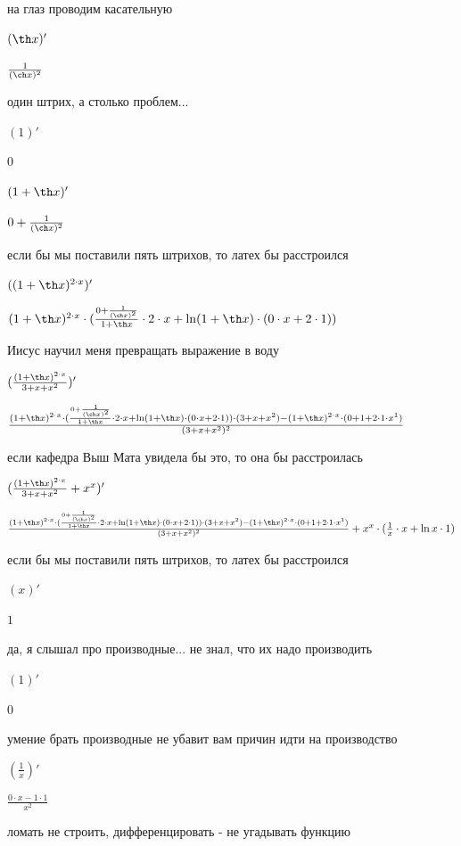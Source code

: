 \documentclass[a4paper,12pt]{article}
\begin{document}
на глаз проводим касательную 

$( \th x)'$

$ \frac{1}{( \ch x)^{2}} $

один штрих, а столько проблем... 

$(1)'$

$0$

  

$(1+ \th x)'$

$0+ \frac{1}{( \ch x)^{2}} $

если бы мы поставили пять штрихов, то латех бы расстроился 

$((1+ \th x)^{2 \cdot x})'$

$(1+ \th x)^{2 \cdot x} \cdot ( \frac{0+ \frac{1}{( \ch x)^{2}} }{1+ \th x}  \cdot 2 \cdot x+ \ln (1+ \th x) \cdot (0 \cdot x+2 \cdot 1))$

Иисус научил меня превращать выражение в воду 

$( \frac{(1+ \th x)^{2 \cdot x}}{3+x+x^{2}} )'$

$ \frac{(1+ \th x)^{2 \cdot x} \cdot ( \frac{0+ \frac{1}{( \ch x)^{2}} }{1+ \th x}  \cdot 2 \cdot x+ \ln (1+ \th x) \cdot (0 \cdot x+2 \cdot 1)) \cdot (3+x+x^{2})-(1+ \th x)^{2 \cdot x} \cdot (0+1+2 \cdot 1 \cdot x^{1})}{(3+x+x^{2})^{2}} $

если кафедра Выш Мата увидела бы это, то она бы расстроилась 

$( \frac{(1+ \th x)^{2 \cdot x}}{3+x+x^{2}} +x^{x})'$

$ \frac{(1+ \th x)^{2 \cdot x} \cdot ( \frac{0+ \frac{1}{( \ch x)^{2}} }{1+ \th x}  \cdot 2 \cdot x+ \ln (1+ \th x) \cdot (0 \cdot x+2 \cdot 1)) \cdot (3+x+x^{2})-(1+ \th x)^{2 \cdot x} \cdot (0+1+2 \cdot 1 \cdot x^{1})}{(3+x+x^{2})^{2}} +x^{x} \cdot ( \frac{1}{x}  \cdot x+ \ln x \cdot 1)$

если бы мы поставили пять штрихов, то латех бы расстроился 

$(x)'$

$1$

да, я слышал про производные... не знал, что их надо производить 

$(1)'$

$0$

умение брать производные не убавит вам причин идти на производство 

$( \frac{1}{x} )'$

$ \frac{0 \cdot x-1 \cdot 1}{x^{2}} $

ломать не строить, дифференцировать - не угадывать функцию 
\end{document}
